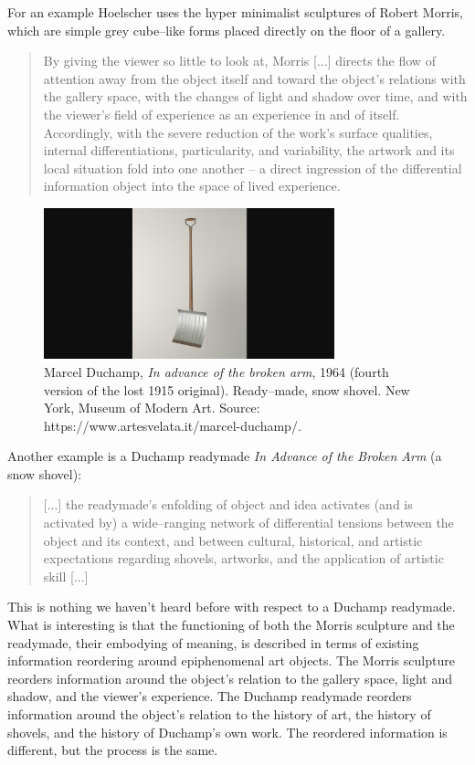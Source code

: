 \documentclass[letterpaper]{article}
\begin{document}
    For an example Hoelscher uses the hyper minimalist sculptures of Robert Morris, which are simple grey cube–like forms placed directly on the floor of a gallery.

    \begin{quote}
        By giving the viewer so little to look at, Morris [...] directs the flow of attention away from the object itself and toward the object's relations with the gallery space, with the changes of light and shadow over time, and with the viewer's field of experience as an experience in and of itself. Accordingly, with the severe reduction of the work's surface qualities, internal differentiations, particularity, and variability, the artwork and its local situation fold into one another – a direct ingression of the differential information object into the space of lived experience. \citep[p.78]{HoelscherArtAsInfrmtn2021}
    \end{quote}

    \begin{figure}[h]
    \includegraphics[width=3.31in]{snow-shovel.png}
    \caption{Marcel Duchamp, \emph{In advance of the broken arm}, 1964 (fourth version of the lost 1915 original). Ready–made, snow shovel. New York, Museum of Modern Art. Source: https://www.artesvelata.it/marcel-duchamp/.}
    \end{figure}

    Another example is a Duchamp readymade \emph{In Advance of the Broken Arm} (a snow shovel):

    \begin{quote}
        [...] the readymade's enfolding of object and idea activates (and is activated by) a wide–ranging network of differential tensions between the object and its context, and between cultural, historical, and artistic expectations regarding shovels, artworks, and the application of artistic skill [...]
    \end{quote}

    This is nothing we haven't heard before with respect to a Duchamp readymade. What is interesting is that the functioning of both the Morris sculpture and the readymade, their embodying of meaning, is described in terms of existing information reordering around epiphenomenal art objects. The Morris sculpture reorders information around the object's relation to the gallery space, light and shadow, and the viewer's experience. The Duchamp readymade reorders information around the object's relation to the history of art, the history of shovels, and the history of Duchamp's own work. The reordered information is different, but the process is the same.
\end{document}
